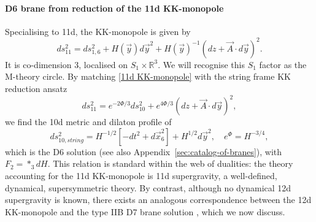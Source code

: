 \paragraph{D6 brane from reduction of the 11d KK-monopole}
Specialising to 11d, the KK-monopole is given by
\begin{equation}
ds_{11}^2=ds_{1,6}^2 + H(\vec{y})d\vec{y}^2+H(\vec{y})^{-1}(dz+\vec{A}\cdot d\vec{y})^2.
\label{11d KK-monopole}
\end{equation}
It is co-dimension 3, localised on $S_1\times\mathbb{R}^3$. 
We will recognise this $S_1$ factor as the M-theory circle.
By matching \eqref{11d KK-monopole} with the string frame KK reduction ansatz
\begin{equation}
ds_{11}^2=e^{-2\Phi/3}ds_{10}^2+e^{4\Phi/3}(dz+ \vec{A}\cdot d\vec{y})^2,
\label{string frame KK reduction ansatz}
\end{equation}
we find the 10d metric and dilaton profile of
\begin{equation}
ds_{10,string}^2=H^{-1/2}[-dt^2+d\vec{x}_6^2] + H^{1/2}d\vec{y}^2,\quad
e^\Phi=H^{-3/4},
\end{equation}
which is the D6 solution \cite{Horowitz:1991cd,Townsend:1995kk} (see also Appendix~\ref{sec:catalog-of-branes}), with $F_2=*_3 dH$.
This relation is standard within the web of dualities: the theory accounting for the 11d KK-monopole is 11d supergravity, a well-defined, dynamical, supersymmetric theory.
By contrast, although no dynamical 12d supergravity is known, there exists an analogous correspondence between the 12d KK-monopole and the type IIB D7 brane solution \cite{Tseytlin:1996ne}, which we now discuss.

